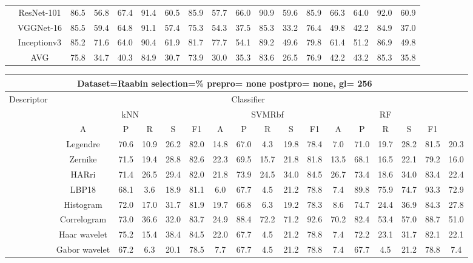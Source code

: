 \documentclass[12pt,italian]{article}
\begin{document}
\begin{tiny}
\begin{longtable}{lcccccccccccccccc}
& ResNet-101 & 86.5 & 56.8 & 67.4 & 91.4 & 60.5 & 85.9 & 57.7 & 66.0 & 90.9 & 59.6 & 85.9 & 66.3 & 64.0 & 92.0 & 60.9 \\ 
& VGGNet-16 & 85.5 & 59.4 & 64.8 & 91.1 & 57.4 & 75.3 & 54.3 & 37.5 & 85.3 & 33.2 & 76.4 & 49.8 & 42.2 & 84.9 & 37.0 \\ 
& Inceptionv3 & 85.2 & 71.6 & 64.0 & 90.4 & 61.9 & 81.7 & 77.7 & 54.1 & 89.2 & 49.6 & 79.8 & 61.4 & 51.2 & 86.9 & 49.8 \\ 
\hline
& AVG & 75.8 & 34.7 & 40.3 & 84.9 & 30.7 & 73.9 & 30.0 & 35.3 & 83.6 & 26.5 & 76.9 & 42.2 & 43.2 & 85.3 & 35.8 \\ 
\hline
\bottomrule
\end{longtable} 

 \pagebreak 
\begin{longtable}{lcccccccccccccccc}
\toprule
\multicolumn{16}{c}{Dataset=Raabin selection=\% prepro= none postpro= none, gl= 256} \\ 
\toprule
Descriptor & \multicolumn{15}{c}{Classifier} \\ 
& \multicolumn{5}{c}{kNN} & \multicolumn{5}{c}{SVMRbf} & \multicolumn{5}{c}{RF} \\ 
& A & P & R & S & F1 & A & P & R & S & F1 & A & P & R & S & F1 \\ 
\midrule
& Legendre & 70.6 & 10.9 & 26.2 & 82.0 & 14.8 & 67.0 &  4.3 & 19.8 & 78.4 &  7.0 & 71.0 & 19.7 & 28.2 & 81.5 & 20.3 \\ 
& Zernike & 71.5 & 19.4 & 28.8 & 82.6 & 22.3 & 69.5 & 15.7 & 21.8 & 81.8 & 13.5 & 68.1 & 16.5 & 22.1 & 79.2 & 16.0 \\ 
& HARri & 71.4 & 26.5 & 29.4 & 82.0 & 21.8 & 73.9 & 24.5 & 34.0 & 84.5 & 26.7 & 73.4 & 18.6 & 34.0 & 83.4 & 22.4 \\ 
& LBP18 & 68.1 &  3.6 & 18.9 & 81.1 &  6.0 & 67.7 &  4.5 & 21.2 & 78.8 &  7.4 & 89.8 & 75.9 & 74.7 & 93.3 & 72.9 \\ 
& Histogram & 72.0 & 17.0 & 31.7 & 81.9 & 19.7 & 66.8 &  6.3 & 19.2 & 78.3 &  8.6 & 74.7 & 24.4 & 36.9 & 84.3 & 27.8 \\ 
& Correlogram & 73.0 & 36.6 & 32.0 & 83.7 & 24.9 & 88.4 & 72.2 & 71.2 & 92.6 & 70.2 & 82.4 & 53.4 & 57.0 & 88.7 & 51.0 \\ 
& Haar wavelet & 75.2 & 15.4 & 38.4 & 84.5 & 22.0 & 67.7 &  4.5 & 21.2 & 78.8 &  7.4 & 72.2 & 23.1 & 31.7 & 82.1 & 22.1 \\ 
& Gabor wavelet & 67.2 &  6.3 & 20.1 & 78.5 &  7.7 & 67.7 &  4.5 & 21.2 & 78.8 &  7.4 & 67.7 &  4.5 & 21.2 & 78.8 &  7.4 \\ 

\end{longtable}
\end{tiny}
\end{document}
